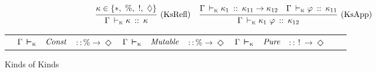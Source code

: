 \begin{figure}[ht!]
\begin{center}
\end{center}
\vspace{-1em}
\begin{gather*}
	\ruleIL	{KsRefl}
		{\kappa \in \{ *, \ \%, \ !, \ \Diamond \}}
		{\ksJudge{\Gamma}{\kappa}{\kappa}}
	\quad
	\ruleIL	{KsApp}
		{\ksJudge
			{\Gamma}
			{\kappa_1}
			{\kappa_{11} \to \kappa_{12}}
		 \quad
		 \ksJudge
			{\Gamma}
			{\varphi}
			{\kappa_{11}}
		}
		{\ksJudge
			{\Gamma}
		 	{\kappa_1 \ \varphi}
		 	{\kappa_{12}}
		}
\end{gather*}

\begin{tabular}{llllllllllll}
 	&	$\Gamma \judgea{K}$ & $\iConst$   	& $:: \% \to \Diamond$ 
 \qq 	&	$\Gamma \judgea{K}$ & $\iMutable$	& $:: \% \to \Diamond$ 
 \qq 	&	$\Gamma \judgea{K}$ & $\iPure$		& $:: \ ! \ \to \Diamond$ 
\end{tabular}

\caption{Kinds of Kinds}
\label{fig:kinds-of-kinds}
\end{figure}